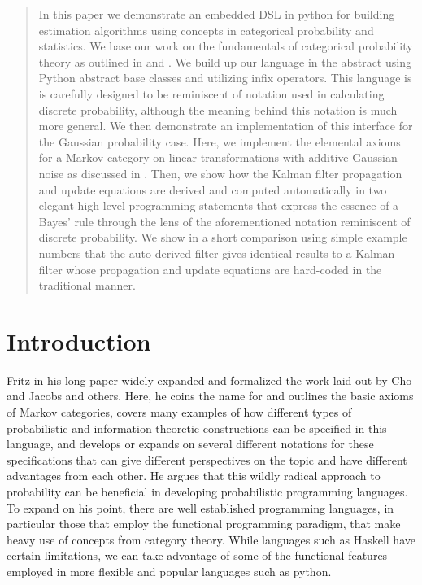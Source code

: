 \begin{abstract}
In this paper we demonstrate an embedded DSL in python for building estimation algorithms using concepts in categorical probability and statistics.
We base our work on the fundamentals of categorical probability theory as outlined in \cite{cho} and \cite{fritz}.
We build up our language in the abstract using Python abstract base classes and utilizing infix operators.
This language is is carefully designed to be reminiscent of notation used in calculating discrete probability, although the meaning behind this notation is much more general.
We then demonstrate an implementation of this interface for the Gaussian probability case.
Here, we implement the elemental axioms for a Markov category on linear transformations with additive Gaussian noise as discussed in \cite{fritz}.
Then, we show how the Kalman filter propagation and update equations are derived and computed automatically in two elegant high-level programming statements that express the essence of a Bayes' rule through the lens of the aforementioned notation reminiscent of discrete probability.
We show in a short comparison using simple example numbers that the auto-derived filter gives identical results to a Kalman filter whose propagation and update equations are hard-coded in the traditional manner.
\end{abstract}

\section{Introduction}
Fritz in his long paper \cite{fritz} widely expanded and formalized the work laid out by Cho and Jacobs \cite{cho} and others.
Here, he coins the name for and outlines the basic axioms of Markov categories, covers many examples of how different types of probabilistic and information theoretic constructions can be specified in this language, and develops or expands on several different notations for these specifications that can give different perspectives on the topic and have different advantages from each other.
He argues that this wildly radical approach to probability can be beneficial in developing probabilistic programming languages.
To expand on his point, there are well established programming languages, in particular those that employ the functional programming paradigm, that make heavy use of concepts from category theory.
While languages such as Haskell have certain limitations, we can take advantage of some of the functional features employed in more flexible and popular languages such as python.

